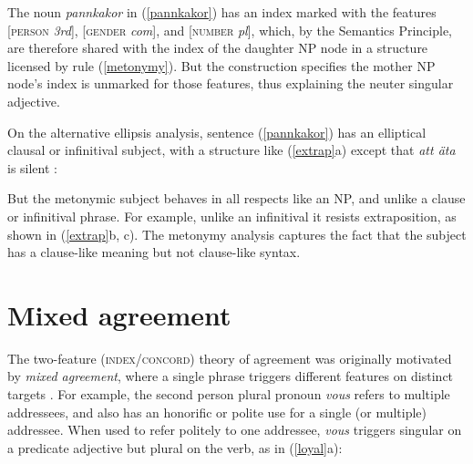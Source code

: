 \documentclass[output=paper
	        ,collection
	        ,collectionchapter
 	        ,biblatex
                ,babelshorthands
                ,newtxmath
                ,draftmode
                ,colorlinks, citecolor=brown
]{langscibook}
\begin{document}
\noindent
The noun \emph{pannkakor} in (\ref{pannkakor}) has an index marked with the features [\textsc{person}  \textit{3rd}], [\textsc{gender} \textit{com}], and [\textsc{number} \textit{pl}], which, by the Semantics Principle, are therefore shared with the index of the daughter NP node in a structure licensed by rule (\ref{metonymy}).  But the construction  specifies the mother NP node's index is unmarked for those features, thus explaining the neuter singular adjective.    

On the alternative ellipsis analysis, sentence (\ref{pannkakor}) has an elliptical clausal or infinitival subject, with a structure like (\ref{extrap}a) except that \emph{att \"{a}ta} is silent \citep{Faarlund:1977, Enger:2004,Josefsson:2009}:  

\begin{exe} 
\ex\label{extrap}
\begin{xlist}
\end{xlist}
\end{exe}

\noindent
But the metonymic subject behaves in all respects like an NP, and unlike a clause or infinitival phrase.  For example, unlike an infinitival it resists extraposition, as shown in (\ref{extrap}b, c).  The metonymy analysis captures the fact that the subject has a clause-like meaning but not clause-like syntax.  
  


\section{Mixed agreement}
\label{mismatch}
 

The two-feature (\textsc{index/concord}) theory of agreement was originally motivated by
\textit{mixed agreement}, where a single phrase triggers different features on distinct targets
\parencites[Chapter~2]{Pollard+Sag:1994}{Kathol99b}.  For example, the  second person plural pronoun \textit{vous} refers to multiple addressees, and also has an honorific or polite use for a single (or multiple) addressee.  When used to refer politely to one addressee, \textit{vous} triggers singular on a predicate adjective but plural on the verb, as in (\ref{loyal}a):
\end{document}
